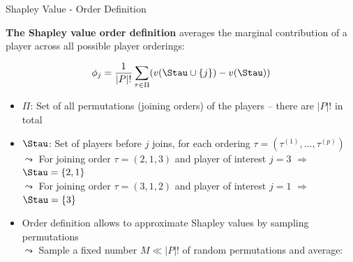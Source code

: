 \documentclass[11pt,compress,t,notes=noshow, aspectratio=169, xcolor=table]{beamer}
\begin{document}
\begin{frame}{Shapley Value - Order Definition}

\textbf{The Shapley value order definition} averages the marginal contribution of a player across all possible player orderings:

$$\phi_j = \frac{1}{|P|!} \sum_{\tau \in \Pi} (v(\Stau \cup \{j\}) - v(\Stau))$$
  
\begin{itemize}[<+->]
  \item $\Pi$: Set of all permutations (joining orders) of the players -- there are \(|P|!\) in total
  \item $\Stau$: Set of players before \(j\) joins, for each ordering \(\tau = (\tau^{(1)}, \dots, \tau^{(p)})\)\\
  \phantom{$\Rightarrow$} $\leadsto$ For joining order $\tau = (2,1,3)$ and player of interest $j=3$ $\Rightarrow$ $\Stau = \{2, 1\}$\\
  \phantom{$\Rightarrow$} $\leadsto$ For joining order $\tau = (3,1,2)$ and player of interest $j=1$ $\Rightarrow$ $\Stau = \{3\}$
\item<3-> Order definition allows to approximate Shapley values by sampling permutations \\
\(\leadsto\) Sample a fixed number \( M \ll |P|! \) of random permutations and average:


\end{itemize}
\end{frame}
\end{document}
